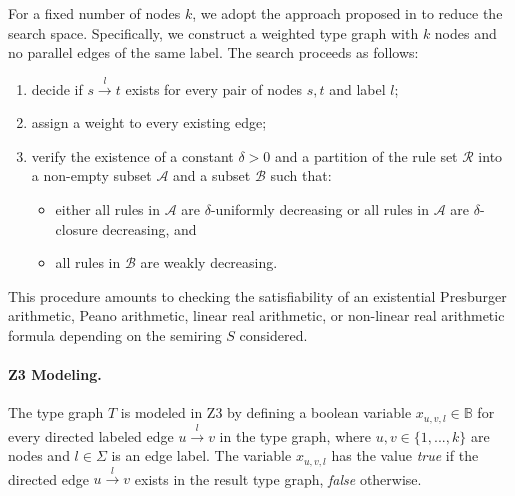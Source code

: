 For a fixed number of nodes $k$, we adopt the approach proposed in \cite{bruggink2015proving, bruggink2014termination,zantema2014termination} to reduce the search space. Specifically, we construct a weighted type graph with
$k$ nodes and no parallel edges of the same label.
The search proceeds as follows: 
\begin{enumerate}
    \item decide if $s \overset{l}{\to} t$ exists for every pair of nodes \( s, t\) and label \( l\);
    \item assign a weight to every existing edge;
    \item verify the existence of a constant $\delta >0$ and a partition of the rule set $\mathcal{R}$ into a non-empty subset $\mathcal{A}$ and a subset $\mathcal{B}$
 such that:
    \begin{itemize}
        \item either all rules in $\mathcal{A}$ are $\delta$-uniformly decreasing or all rules in $\mathcal{A}$ are $\delta$-closure decreasing, and
        \item all rules in $\mathcal{B}$ are weakly decreasing.
    \end{itemize}
\end{enumerate}


This procedure amounts to checking the satisfiability of an existential Presburger arithmetic, Peano arithmetic, linear real arithmetic, or non-linear real arithmetic formula depending on the semiring $S$ considered.

\paragraph{Z3 Modeling.}
The type graph $T$ is modeled in Z3 by defining 
a boolean variable $x_{u,v,l} \mathop{\in} \mathbb{B}$ for every directed labeled edge $u\overset{l}{\to} v$ in the type graph, where $u,v\in\{1,...,k\}$ are nodes and $l \mathop{\in} \Sigma$ is an edge label. 
The variable $x_{u,v,l}$ has the value \textit{true} if the directed edge $u\overset{l}{\to} v$ exists in the result type graph, \textit{false} otherwise. 

